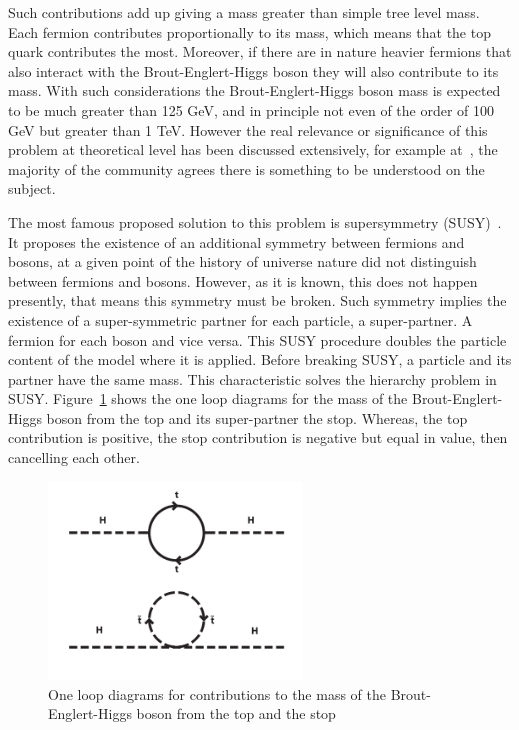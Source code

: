 Such contributions add up giving a mass greater than simple tree level mass. Each fermion contributes proportionally to its mass, which means that the top quark contributes the most. Moreover, if there are in nature heavier fermions that also interact with the Brout-Englert-Higgs boson they will also contribute to its mass. With such considerations the Brout-Englert-Higgs boson mass is expected to be much greater than 125 GeV, and in principle not even of the order of 100 GeV but greater than 1 TeV. However the real relevance or significance of this problem at theoretical level has been discussed extensively, for example at~\cite{Jegerlehner:2013nna}, the majority of the community agrees there is something to be understood on the subject. 

The most famous proposed solution to this problem is supersymmetry (SUSY)~\cite{Martin:1997ns}. It proposes the existence of an additional symmetry between fermions and bosons, at a given point of the history of universe nature did not distinguish between fermions and bosons. However, as it is known, this does not happen presently, that means this symmetry must be broken. Such symmetry implies the existence of a super-symmetric partner for each particle, a super-partner. A fermion for each boson and vice versa. This SUSY procedure doubles the particle content of the model where it is applied. Before breaking SUSY, a particle and its partner have the same mass. This characteristic solves the hierarchy problem in SUSY. Figure~\ref{fig:susy} shows the one loop diagrams for the mass of the Brout-Englert-Higgs boson from the top and its super-partner the stop. Whereas, the top contribution is positive, the stop contribution is negative but equal in value, then cancelling each other.

\begin{figure}[!Hhtbp]
  \begin{center}
    \includegraphics[width=0.6\textwidth]{figs/SUSY.png}
    \caption{One loop diagrams for contributions to the mass of the Brout-Englert-Higgs boson from the top and the stop}
    \label{fig:susy}
  \end{center}
\end{figure}

